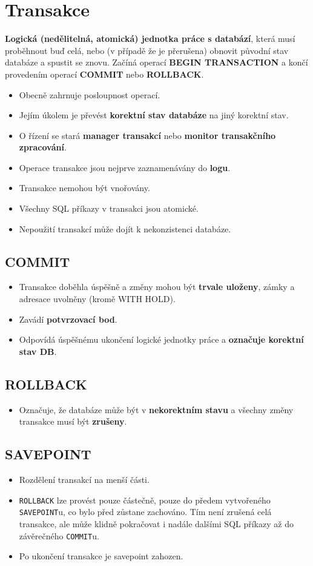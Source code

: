 \section{Transakce}
\textbf{Logická (nedělitelná, atomická) jednotka práce s databází}, která musí proběhnout buď celá, nebo (v případě že je přerušena) obnovit původní stav databáze a spustit se znovu. Začíná operací \textbf{BEGIN TRANSACTION} a končí provedením operací \textbf{COMMIT} nebo \textbf{ROLLBACK}.
\begin{itemize}
    \item Obecně zahrnuje posloupnost operací.
    \item Jejím úkolem je převést \textbf{korektní stav databáze} na jiný korektní stav.
    \item O řízení se stará \textbf{manager transakcí} nebo \textbf{monitor transakčního zpracování}.
    \item Operace transakce jsou nejprve zaznamenávány do\textbf{ logu}.
    \item Transakce nemohou být vnořovány.
    \item Všechny SQL příkazy v transakci jsou atomické.
    \item Nepoužití transakcí může dojít k nekonzistenci databáze.
\end{itemize}

\subsection{COMMIT}
\begin{itemize}
    \item Transakce doběhla úspěšně a změny mohou být \textbf{trvale uloženy}, zámky a adresace uvolněny (kromě WITH HOLD).
    \item Zavádí \textbf{potvrzovací bod}.
    \item Odpovídá úspěšnému ukončení logické jednotky práce a \textbf{označuje korektní stav DB}.
\end{itemize}
\subsection{ROLLBACK}
\begin{itemize}
    \item Označuje, že databáze může být v \textbf{nekorektním stavu} a všechny změny transakce musí být \textbf{zrušeny}.
\end{itemize}

\subsection{SAVEPOINT}
\begin{itemize}
    \item Rozdělení transakcí na menší části.
    \item \texttt{ROLLBACK} lze provést pouze částečně, pouze do předem vytvořeného \texttt{SAVEPOINT}u, co bylo před zůstane zachováno. Tím není zrušená celá transakce, ale může klidně pokračovat i nadále dalšími SQL příkazy až do závěrečného \texttt{COMMIT}u.
    \item Po ukončení transakce je savepoint zahozen.
\end{itemize}

